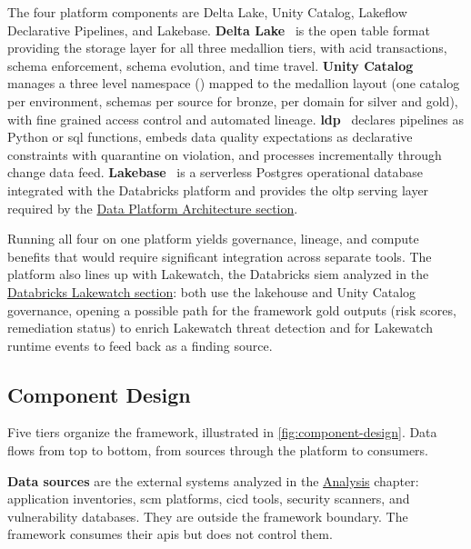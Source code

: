 The four platform components are Delta Lake, Unity Catalog, Lakeflow Declarative Pipelines, and Lakebase. \textbf{Delta Lake}~\cite{Armbrust2020, Lee2024} is the open table format providing the storage layer for all three medallion tiers, with \gls{acid} transactions, schema enforcement, schema evolution, and time travel. \textbf{Unity Catalog}~\cite{DatabricksUC2025} manages a three level namespace () mapped to the medallion layout (one catalog per environment, schemas per source for bronze, per domain for silver and gold), with fine grained access control and automated lineage. \textbf{\Gls{ldp}}~\cite{DatabricksLDP2025} declares pipelines as Python or \gls{sql} functions, embeds data quality expectations as declarative constraints with quarantine on violation, and processes incrementally through change data feed. \textbf{Lakebase}~\cite{DatabricksLakebase2026} is a serverless Postgres operational database integrated with the Databricks platform and provides the \gls{oltp} serving layer required by the \hyperref[sec:data-architecture]{Data Platform Architecture section}.

Running all four on one platform yields governance, lineage, and compute benefits that would require significant integration across separate tools. The platform also lines up with Lakewatch, the Databricks \gls{siem} analyzed in the \hyperref[sec:lakewatch]{Databricks Lakewatch section}: both use the lakehouse and Unity Catalog governance, opening a possible path for the framework gold outputs (risk scores, remediation status) to enrich Lakewatch threat detection and for Lakewatch runtime events to feed back as a finding source.


\subsection{Component Design}
\label{sec:component-design}

Five tiers organize the framework, illustrated in \autoref{fig:component-design}. Data flows from top to bottom, from sources through the platform to consumers.



\textbf{Data sources} are the external systems analyzed in the \hyperref[ch:analysis]{Analysis} chapter: application inventories, \gls{scm} platforms, \gls{cicd} tools, security scanners, and vulnerability databases. They are outside the framework boundary. The framework consumes their \glspl{api} but does not control them.

